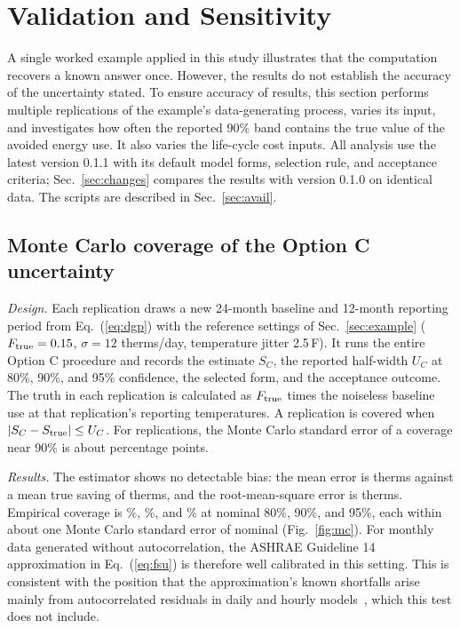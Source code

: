 \section{Validation and Sensitivity}\label{sec:validation}

A single worked example applied in this study illustrates that the computation recovers a known answer once. However, the results do not establish the accuracy of the uncertainty stated. To ensure accuracy of results, this section performs multiple replications of the example's data-generating process, varies its input, and investigates how often the reported 90\% band contains the true value of the avoided energy use. It also varies the life-cycle cost inputs. All analysis use the latest version 0.1.1 with its default model forms, selection rule, and acceptance criteria; Sec.~\ref{sec:changes} compares the results with version 0.1.0 on identical data. The scripts are described in Sec.~\ref{sec:avail}.

\subsection{Monte Carlo coverage of the Option C uncertainty}\label{sec:val_c}

\emph{Design.} Each replication draws a new 24-month baseline and 12-month reporting period from Eq.~(\ref{eq:dgp}) with the reference settings of Sec.~\ref{sec:example} ($F_{\rm true}=0.15$, $\sigma=12$ therms/day, temperature jitter 2.5\,F). It runs the entire Option C procedure and records the estimate $S_C$, the reported half-width $U_C$ at 80\%, 90\%, and 95\% confidence, the selected form, and the acceptance outcome. The truth in each replication is calculated as $F_{\rm true}$ times the noiseless baseline use at that replication's reporting temperatures. A replication is covered when $|S_C-S_{\rm true}|\le U_C$. For \McReps{} replications, the Monte Carlo standard error of a coverage near 90\% is about \McSeRef{} percentage points.

\emph{Results.} The estimator shows no detectable bias: the mean error is \McMeanErr{} therms against a mean true saving of \McMeanTrue{} therms, and the root-mean-square error is \McRmse{} therms. Empirical coverage is \McCovEighty\%, \McCovNinety\%, and \McCovNinetyFive\% at nominal 80\%, 90\%, and 95\%, each within about one Monte Carlo standard error of nominal (Fig.~\ref{fig:mc}). For monthly data generated without autocorrelation, the ASHRAE Guideline 14 approximation in Eq.~(\ref{eq:fsu}) is therefore well calibrated in this setting. This is consistent with the position that the approximation's known shortfalls arise mainly from autocorrelated residuals in daily and hourly models~\cite{touzani2019}, which this test does not include.


